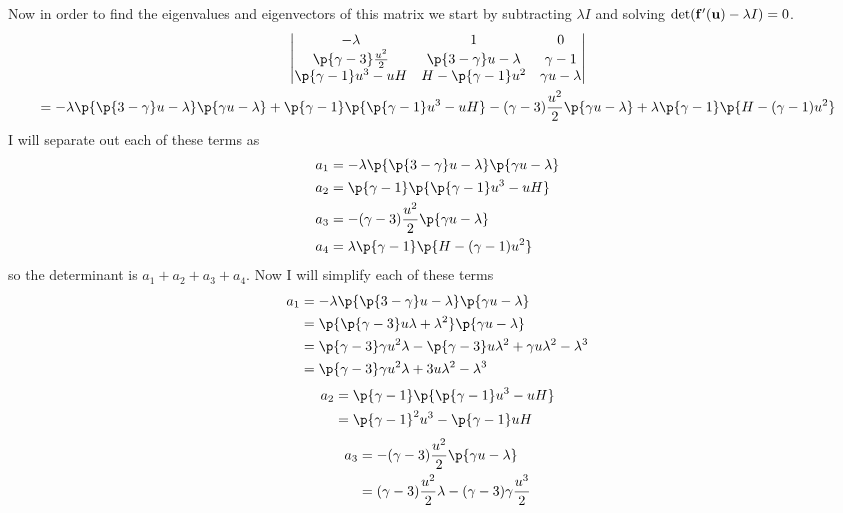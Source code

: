 \documentclass[11pt, oneside]{article}
\begin{document}
\begin{enumerate}
    Now in order to find the eigenvalues and eigenvectors of this matrix we
    start by subtracting $\lambda I$ and solving
    $\det(\mathbf{f}'(\mathbf{u}) - \lambda I) = 0$.
    \begin{gather*}
      \begin{vmatrix}
        -\lambda & 1 & 0 \\
        \p{\gamma - 3} \frac{u^2}{2} & \p{3 - \gamma}u - \lambda & \gamma - 1 \\
        \p{\gamma - 1} u^3 - u H & H - \p{\gamma - 1}u^2  & \gamma u - \lambda
      \end{vmatrix} \\
      = -\lambda \p{\p{3 - \gamma}u - \lambda} \p{\gamma u - \lambda} + \p{\gamma - 1}\p{\p{\gamma - 1} u^3 - uH} - (\gamma - 3)\frac{u^2}{2}\p{\gamma u - \lambda} + \lambda \p{\gamma - 1} \p{H - (\gamma - 1)u^2}
    \end{gather*}
    I will separate out each of these terms as
    \begin{align*}
      a_1 &= -\lambda \p{\p{3 - \gamma}u - \lambda} \p{\gamma u - \lambda} \\
      a_2 &= \p{\gamma - 1}\p{\p{\gamma - 1} u^3 - uH} \\
      a_3 &= - (\gamma - 3)\frac{u^2}{2}\p{\gamma u - \lambda} \\
      a_4 &= \lambda \p{\gamma - 1} \p{H - (\gamma - 1)u^2}
    \end{align*}
    so the determinant is $a_1 + a_2 + a_3 + a_4$.
    Now I will simplify each of these terms
    \begin{align*}
      a_1 &=  -\lambda \p{\p{3 - \gamma}u - \lambda} \p{\gamma u - \lambda} \\
      &= \p{\p{\gamma - 3}u\lambda + \lambda^2} \p{\gamma u - \lambda} \\
      &= \p{\gamma - 3}\gamma u^2 \lambda - \p{\gamma - 3} u\lambda^2 + \gamma u \lambda^2 - \lambda^3 \\
      &= \p{\gamma - 3}\gamma u^2 \lambda + 3u \lambda^2 - \lambda^3
    \end{align*}
    \begin{align*}
      a_2 &= \p{\gamma - 1}\p{\p{\gamma - 1} u^3 - uH} \\
      &= \p{\gamma - 1}^2 u^3 - \p{\gamma - 1}uH
    \end{align*}
    \begin{align*}
      a_3 &= - (\gamma - 3)\frac{u^2}{2}\p{\gamma u - \lambda} \\
      &= (\gamma - 3)\frac{u^2}{2}\lambda - (\gamma - 3)\gamma\frac{u^3}{2}

\end{align*}
\end{enumerate}
\end{document}
